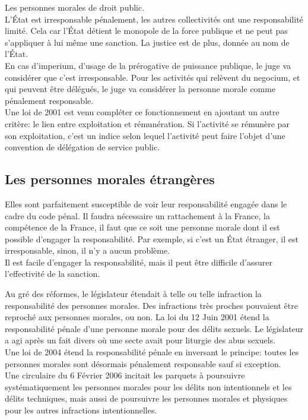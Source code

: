 \documentclass[10pt, a4paper, openany]{book}
\begin{document}
Les personnes morales de droit public. \\
L'État est irresponsable pénalement, les autres collectivités ont une responsabilité limité. Cela car l'État détient le monopole de la force publique et ne peut pas s'appliquer à lui même une sanction. La justice est de plus, donnée au nom de l'État. \\
En cas d'imperium, d'usage de la prérogative de puissance publique, le juge va considérer que c'est irresponsable. Pour les activités qui relèvent du negocium, et qui peuvent être délégués, le juge va considérer la personne morale comme pénalement responsable. \\
Une loi de 2001 est venu compléter ce fonctionnement en ajoutant un autre critère: le lien entre exploitation et rémunération. Si l'activité se rémunère par son exploitation, c'est un indice selon lequel l'activité peut faire l'objet d'une convention de délégation de service public. 

\subsection{Les personnes morales étrangères}

Elles sont parfaitement susceptible de voir leur responsabilité engagée dans le cadre du code pénal. Il faudra nécessaire un rattachement à la France, la compétence de la France, il faut que ce soit une personne morale dont il est possible d'engager la responsabilité. Par exemple, si c'est un État étranger, il est irresponsable, sinon, il n'y a aucun problème. \\
Il est facile d'engager la responsabilité, mais il peut être difficile d'assurer l'effectivité de la sanction. 


Au gré des réformes, le législateur étendait à telle ou telle infraction la responsabilité des personnes morales. Des infractions très proches pouvaient être reproché aux personnes morales, ou non. La loi du 12 Juin 2001 étend la responsabilité pénale d'une personne morale pour des délits sexuels. Le législateur a agi après un fait divers où une secte avait pour liturgie des abus sexuels. \\
Une loi de 2004 étend la responsabilité pénale en inversant le principe: toutes les personnes morales sont désormais pénalement responsable sauf si exception. \\
Une circulaire du 6 Février 2006 incitait les parquets à poursuivre systématiquement les personnes morales pour les délits non intentionnels et les délits techniques, mais aussi de poursuivre les personnes morales et physiques pour les autres infractions intentionnelles. 
\end{document}
